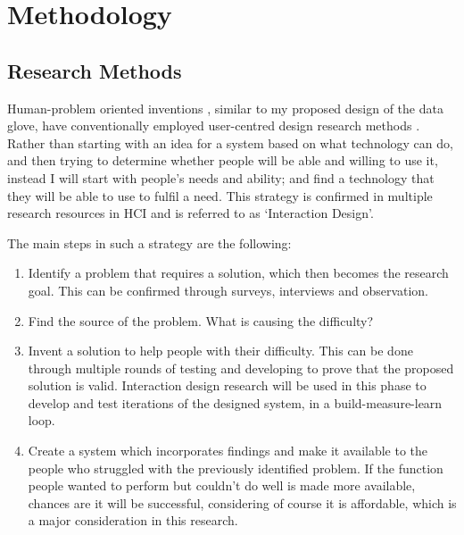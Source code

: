 \chapter{Methodology}

\section{Research Methods}

Human-problem oriented inventions \parencite{Cox2008} , similar to my proposed design of the data glove, have conventionally employed user-centred design research methods \parencite{Bevan1999}. Rather than starting with an idea for a system based on what technology can do, and then trying to determine whether people will be able and willing to use it, instead I will start with people's needs and ability; and find a technology that they will be able to use to fulfil a need. This strategy is confirmed in multiple research resources in HCI \parencite{Dix2004} and is referred to as ‘Interaction Design’.

The main steps in such a strategy are the following: 

\begin{enumerate}
    \item Identify a problem that requires a solution, which then becomes the research goal. This can be confirmed through surveys, interviews and observation. 
    \item Find the source of the problem. What is causing the difficulty?
    \item Invent a solution to help people with their difficulty. This can be done through multiple rounds of testing and developing to prove that the proposed solution is valid. Interaction design research will be used in this phase to develop and test iterations of the designed system, in a build-measure-learn loop.
    \item Create a system which incorporates findings and make it available to the people who struggled with the previously identified problem. If the function people wanted to perform but couldn't do well is made more available, chances are it will be successful, considering of course it is affordable, which is a major consideration in this research.
\end{enumerate}

